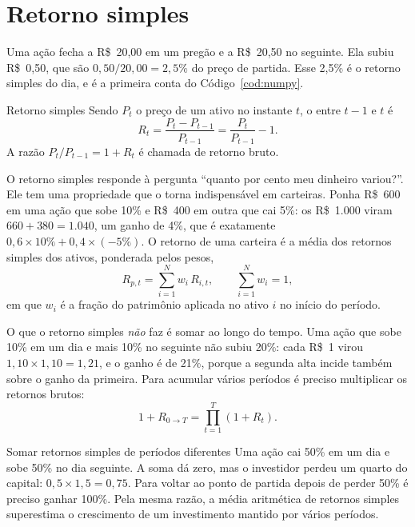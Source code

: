 \section{Retorno simples}

Uma ação fecha a R\$~20,00 em um pregão e a R\$~20,50 no seguinte. Ela subiu R\$~0,50, que são $0,50/20,00 = 2,5\%$ do preço de partida. Esse 2,5\% é o retorno simples do dia, e é a primeira conta do Código~\ref{cod:numpy}.

\begin{definicao}{Retorno simples}
Sendo $P_t$ o preço de um ativo no instante $t$, o  entre $t-1$ e $t$ é
\begin{equation}
  R_t = \frac{P_t - P_{t-1}}{P_{t-1}} = \frac{P_t}{P_{t-1}} - 1 .
  \label{eq:ret-simples}
\end{equation}
A razão $P_t / P_{t-1} = 1 + R_t$ é chamada de retorno bruto.
\end{definicao}

O retorno simples responde à pergunta ``quanto por cento meu dinheiro variou?''. Ele tem uma propriedade que o torna indispensável em carteiras. Ponha R\$~600 em uma ação que sobe 10\% e R\$~400 em outra que cai 5\%: os R\$~1.000 viram $660 + 380 = 1.040$, um ganho de 4\%, que é exatamente $0,6 \times 10\% + 0,4 \times (-5\%)$. O retorno de uma carteira é a média dos retornos simples dos ativos, ponderada pelos pesos,
\begin{equation}
  R_{p,t} = \sum_{i=1}^{N} w_i \, R_{i,t} , \qquad \sum_{i=1}^{N} w_i = 1 ,
  \label{eq:ret-carteira}
\end{equation}
em que $w_i$ é a fração do patrimônio aplicada no ativo $i$ no início do período.

O que o retorno simples \emph{não} faz é somar ao longo do tempo. Uma ação que sobe 10\% em um dia e mais 10\% no seguinte não subiu 20\%: cada R\$~1 virou $1,10 \times 1,10 = 1,21$, e o ganho é de 21\%, porque a segunda alta incide também sobre o ganho da primeira. Para acumular vários períodos é preciso multiplicar os retornos brutos:
\begin{equation}
  1 + R_{0 \to T} = \prod_{t=1}^{T} (1 + R_t) .
  \label{eq:composicao}
\end{equation}

\begin{armadilha}{Somar retornos simples de períodos diferentes}
Uma ação cai 50\% em um dia e sobe 50\% no dia seguinte. A soma dá zero, mas o investidor perdeu um quarto do capital: $0,5 \times 1,5 = 0,75$. Para voltar ao ponto de partida depois de perder 50\% é preciso ganhar 100\%. Pela mesma razão, a média aritmética de retornos simples superestima o crescimento de um investimento mantido por vários períodos.
\end{armadilha}

